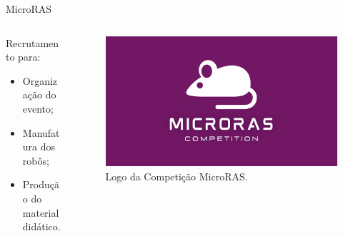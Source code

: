 \begin{frame}{MicroRAS}
    \begin{columns}
        
        \begin{column}{0.6\textwidth}
            Recrutamento para:\\
            \begin{itemize}
                \item Organização do evento;
                \item Manufatura dos robôs;
                \item Produção do material didático.
            \end{itemize}
        \end{column}

        \begin{column}{0.4\textwidth}
            \begin{figure}
                \centering
                \includegraphics[height = 0.35\textheight]{img/micro-ras.png}
                \caption{Logo da Competição MicroRAS.}
            \end{figure}
        \end{column}

    \end{columns}
\end{frame}

